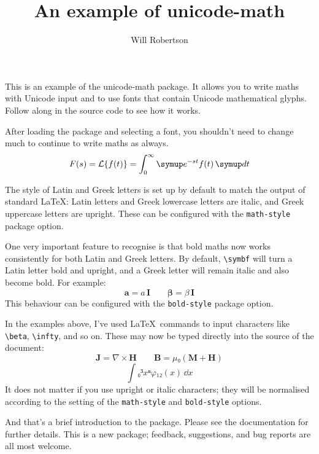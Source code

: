 \documentclass{article}
\begin{document}
\title{An example of \textsf{unicode-math}}
\author{Will Robertson}
\maketitle

This is an example of the \textsf{unicode-math} package.
It allows you to write maths with Unicode input and to use fonts that contain Unicode mathematical glyphs. Follow along in the source code to see how it works.

After loading the package and selecting a font, you shouldn't need to change much to continue to write maths as always.
\[
   F(s)=\mathcal{L} \{f(t)\}=\int_0^\infty \symup e^{-st}f(t)\,\symup d t
\]

The style of Latin and Greek letters is set up by default to match the output of standard \LaTeX: Latin letters and Greek lowercase letters are italic, and Greek uppercase letters are upright. These can be configured with the \texttt{math-style} package option.

One very important feature to recognise is that bold maths now works consistently for both Latin and Greek letters. By default, \verb|\symbf| will turn a Latin letter bold and upright, and a Greek letter will remain italic and also become bold. For example:
\[
  \symbf{a} = a\,\symbf{I} \qquad \symbf{\beta} = \beta\,\symbf{I}
\]
This behaviour can be configured with the \texttt{bold-style} package option.

In the examples above, I've used \LaTeX\ commands to input characters like \verb|\beta|, \verb|\infty|, and so on. These may now be typed directly into the source of the document:
\[
   𝐉 = ∇×𝐇 \qquad 𝐁 = μ₀(𝐌 + 𝐇)
\]
\[
  ∫₀³ xⁿφ₁₂(x)\,ⅆx
\]
It does not matter if you use upright or italic characters; they will be normalised according to the setting of the \texttt{math-style} and \texttt{bold-style} options.

And that's a brief introduction to the package. Please see the documentation for further details. This is a new package; feedback, suggestions, and bug reports are all most welcome.
\end{document}
